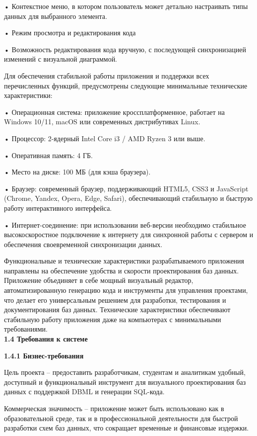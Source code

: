 • Контекстное меню, в котором пользователь может детально настраивать типы данных для выбранного элемента.

• Режим просмотра и редактирования кода

• Возможность редактирования кода вручную, с последующей синхронизацией изменений с визуальной диаграммой.


Для обеспечения стабильной работы приложения и поддержки всех перечисленных функций, предусмотрены следующие минимальные технические характеристики:

 • Операционная система: приложение кроссплатформенное, работает на Windows 10/11, macOS или современных дистрибутивах Linux.
 
 • Процессор: 2-ядерный Intel Core i3 / AMD Ryzen 3 или выше.
 
 • Оперативная память: 4 ГБ.
 
 • Место на диске: 100 МБ (для кэша браузера).
 
 • Браузер: современный браузер, поддерживающий HTML5, CSS3 и JavaScript (Chrome, Yandex, Opera, Edge, Safari), обеспечивающий стабильную и быструю работу интерактивного интерфейса.
 
 • Интернет-соединение: при использовании веб-версии необходимо стабильное высокоскоростное подключение к интернету для синхронной работы с сервером и обеспечения своевременной синхронизации данных.

Функциональные и технические характеристики разрабатываемого приложения направлены на обеспечение удобства и скорости проектирования баз данных. Приложение объединяет в себе мощный визуальный редактор, автоматизированную генерацию кода и инструменты для управления проектами, что делает его универсальным решением для разработки, тестирования и документирования баз данных. Технические характеристики обеспечивают стабильную работу приложения даже на компьютерах с минимальными требованиями.
\\

\textbf{\large 1.4 Требования к системе}

\textbf{\large 1.4.1 Бизнес-требования}

	Цель проекта – предоставить разработчикам, студентам и аналитикам удобный, доступный и функциональный инструмент для визуального проектирования баз данных с поддержкой DBML и генерации SQL-кода.
    
	Коммерческая значимость – приложение может быть использовано как в образовательной среде, так и в профессиональной деятельности для быстрой разработки схем баз данных, что сокращает временные и финансовые издержки.
    
